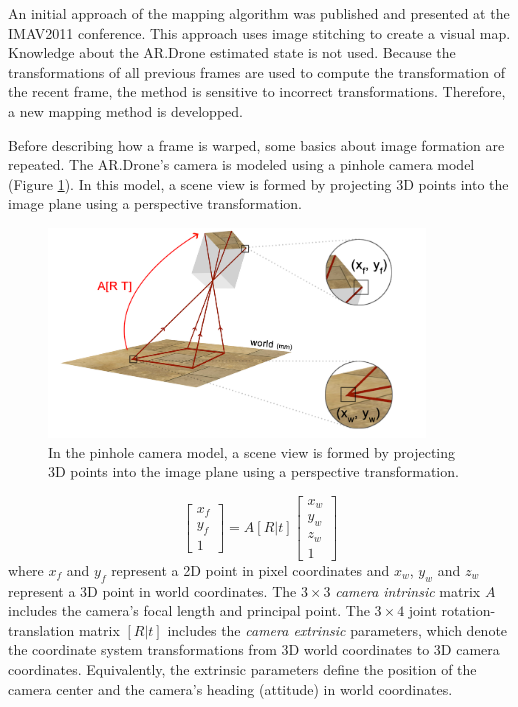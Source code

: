 An initial approach of the mapping algorithm was published \cite{Visser2011imav} and presented at the IMAV2011 conference.
This approach uses image stitching \cite{levin2004seamless} to create a visual map.
Knowledge about the AR.Drone estimated state is not used.
Because the transformations of all previous frames are used to compute the transformation of the recent frame, the method is sensitive to incorrect transformations.
Therefore, a new mapping method is developped.

Before describing how a frame is warped, some basics about image formation are repeated. %
The AR.Drone's camera is modeled using a pinhole camera model (Figure \ref{fig:mapping1}).
In this model, a scene view is formed by projecting 3D points into the image plane using a perspective transformation.

\begin{figure}[htb]
\centering
\includegraphics[width=10cm]{images/mapping0.png}
\caption{In the pinhole camera model, a scene view is formed by projecting 3D points into the image plane using a perspective transformation.}
\label{fig:mapping1}
\end{figure}

\begin{equation}
\left[ {
\begin{array}{c} x_f \\ y_f \\ 1 \end{array}
} \right]
= A[R|t]
\left[ {
\begin{array}{c} x_w \\ y_w \\ z_w \\ 1 \end{array}
} \right]
\end{equation}
where $x_f$ and $y_f$ represent a 2D point in pixel coordinates and $x_w$, $y_w$ and $z_w$ represent a 3D point in world coordinates.
The $3 \times 3$ \textit{camera intrinsic} matrix $A$ includes the camera's focal length and principal point.
The $3 \times 4$ joint rotation-translation matrix $[R|t]$ includes the \textit{camera extrinsic} parameters, which denote the coordinate system transformations from 3D world coordinates to 3D camera coordinates. Equivalently, the extrinsic parameters define the position of the camera center and the camera's heading (attitude) in world coordinates.

